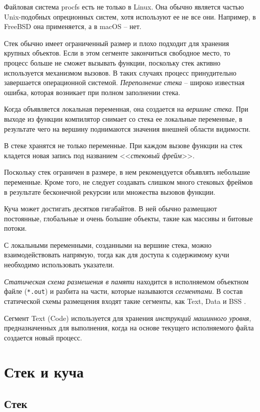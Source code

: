 \documentclass[%
	11pt,
	a4paper,
	utf8,
		]{article}
\begin{document}
Файловая система procfs есть не только в Linux. Она обычно является частью Unix-подобных опреционных систем, хотя используют ее не все они. Например, в FreeBSD она применяется, а в macOS -- нет.

Стек обычно имеет ограниченный размер и плохо подходит для хранения крупных объектов. Если в этом сегменте закончиться свободное место, то процесс больше не сможет вызывать функции, поскольку стек активно используется механизмом вызовов. В таких случаях процесс принудительно завершается операционной системой. \emph{Переполнение стека} -- широко известная ошибка, которая возникает при полном заполнении стека. 

Когда объявляется локальная переменная, она создается на \emph{вершине стека}. При выходе из функции компилятор снимает со стека ее локальные переменные, в результате чего на вершину поднимаются значения внешней области видимости.

В стеке хранятся не только переменные. При каждом вызове функции на стек кладется новая запись под названием <<\emph{стековый фрейм}>>. 

Поскольку стек ограничен в размере, в нем рекомендуется объявлять небольшие переменные. Кроме того, не следует создавать слишком много стековых фреймов в результате бесконечной рекурсии или множества вызовов функции.

Куча может достигать десятков гигабайтов. В ней обычно размещают постоянные, глобальные и очень большие объекты, такие как массивы и битовые потоки.

С локальными переменными, созданными на вершине стека, можно взаимодействовать напрямую, тогда как для доступа к содержимому кучи необходимо использовать указатели.

\emph{Статическая схема размешения в памяти} находится в исполняемом объектном файле (\verb|*.out|) и разбита на части, которые называются \emph{сегментами}. В состав статической схемы размещения входят такие сегменты, как Text, Data и BSS \cite[]{amini-extreme-c:2022}.

Сегмент Text (Code) используется для хранения \emph{инструкций машинного уровня}, предназначенных для выполнения, когда на основе текущего исполняемого файла создается новый процесс.

\section{Стек и куча}

\subsection{Стек}
\end{document}
